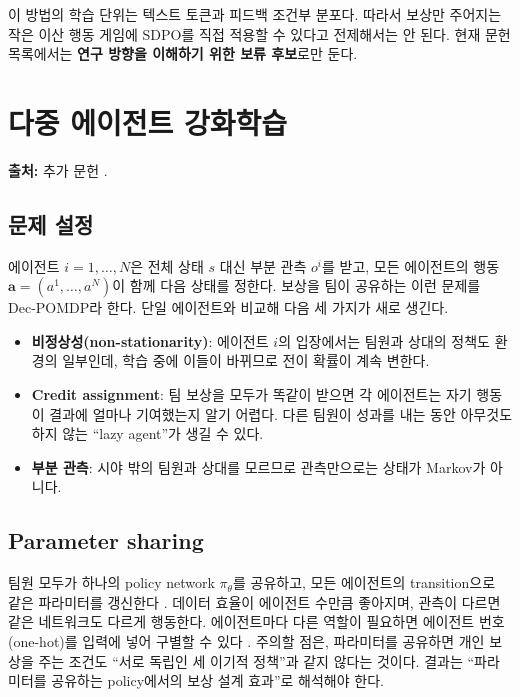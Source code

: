 \documentclass[11pt,a4paper]{article}
\begin{document}
이 방법의 학습 단위는 텍스트 토큰과 피드백 조건부 분포다. 따라서 보상만 주어지는 작은 이산 행동 게임에 SDPO를 직접 적용할 수 있다고 전제해서는 안 된다. 현재 문헌 목록에서는 \textbf{연구 방향을 이해하기 위한 보류 후보}로만 둔다.

\section{다중 에이전트 강화학습}\label{sec:marl}
\noindent\textbf{출처:} 추가 문헌 \cite{gupta2017,terry2020,ippo,mappo,maddpg,coma,vdn,qmix,happo,mat,dial,commnet,tarmac,intention,lowe2019}.

\subsection{문제 설정}
에이전트 \(i=1,\dots,N\)은 전체 상태 \(s\) 대신 부분 관측 \(o^i\)를 받고, 모든 에이전트의 행동 \(\boldsymbol a=(a^1,\dots,a^N)\)이 함께 다음 상태를 정한다. 보상을 팀이 공유하는 이런 문제를 Dec-POMDP라 한다. 단일 에이전트와 비교해 다음 세 가지가 새로 생긴다.
\begin{itemize}
 \item \textbf{비정상성(non-stationarity)}: 에이전트 \(i\)의 입장에서는 팀원과 상대의 정책도 환경의 일부인데, 학습 중에 이들이 바뀌므로 전이 확률이 계속 변한다.
 \item \textbf{Credit assignment}: 팀 보상을 모두가 똑같이 받으면 각 에이전트는 자기 행동이 결과에 얼마나 기여했는지 알기 어렵다. 다른 팀원이 성과를 내는 동안 아무것도 하지 않는 ``lazy agent''가 생길 수 있다.
 \item \textbf{부분 관측}: 시야 밖의 팀원과 상대를 모르므로 관측만으로는 상태가 Markov가 아니다.
\end{itemize}

\subsection{Parameter sharing}
팀원 모두가 하나의 policy network \(\pi_\theta\)를 공유하고, 모든 에이전트의 transition으로 같은 파라미터를 갱신한다 \cite{gupta2017}. 데이터 효율이 에이전트 수만큼 좋아지며, 관측이 다르면 같은 네트워크도 다르게 행동한다. 에이전트마다 다른 역할이 필요하면 에이전트 번호(one-hot)를 입력에 넣어 구별할 수 있다 \cite{terry2020}. 주의할 점은, 파라미터를 공유하면 개인 보상을 주는 조건도 ``서로 독립인 세 이기적 정책''과 같지 않다는 것이다. 결과는 ``파라미터를 공유하는 policy에서의 보상 설계 효과''로 해석해야 한다.
\end{document}
